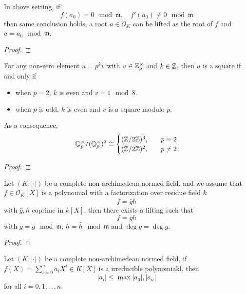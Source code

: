 \begin{corollary}
    In above setting, if 
    \[f(a_0) = 0 \mod \mathfrak{m}, \quad f'(a_0) \neq 0 \mod \mathfrak{m}\] 
    then same conclusion holds, a root \(a \in \mathcal{O}_K\) can be lifted as the root of \(f\) and \(a = a_0 \mod \mathfrak{m}\). 
\end{corollary}

\begin{proof}
    
\end{proof}

\begin{corollary}
    For any non-zero element \(u = p^kv\) with \(v \in \mathbb{Z}_p^\times\) and \(k \in \mathbb{Z}\), then \(u\) is a square if and only if 
    \begin{itemize}
        \item when \(p =2\), \(k \) is even and \(v =1 \mod 8\).    
        \item when \(p\) is odd, \(k\) is even and \(v\) is a square modulo \(p\).
    \end{itemize}
    As a consequence,
    \[\mathbb{Q}_p^\times /(\mathbb{Q}_p^\times)^2 \cong \begin{cases}
        (\mathbb{Z}/2\mathbb{Z})^3, \quad & p  = 2 \\
        (\mathbb{Z}/2\mathbb{Z})^2, \quad & p \neq 2
    \end{cases}\]
\end{corollary}
\begin{proof}
    
\end{proof}


\begin{theorem}
    Let \((K,|\cdot|)\) be a complete non-archimedean normed field, and we assume that \(f \in \mathcal{O}_K[X]\) is a polynomial with a factorization over residue field \(k\)
    \[\bar{f} = \bar{g}\bar{h}\]
    with \(\bar{g},\bar{h}\) coprime in \(k[X]\), then there exists a lifting such that 
    \[f = gh\]
    with \(g = \bar{g} \mod \mathfrak{m}\), \(h = \bar{h} \mod \mathfrak{m}\) and \(\deg g = \deg \bar{g}\).
\end{theorem}

\begin{proof}
    
\end{proof}

\begin{corollary}
    Let \((K,|\cdot|)\) be a complete non-archimedean normed field, if \(f(X) = \sum_{i=0}^n a_iX^i \in K[X]\) is a irreducible polynomiakl, then 
    \[|a_i| \leq \max{|a_0|,|a_n|}\]
    for all \(i = 0,1,\dots,n\).
\end{corollary}

